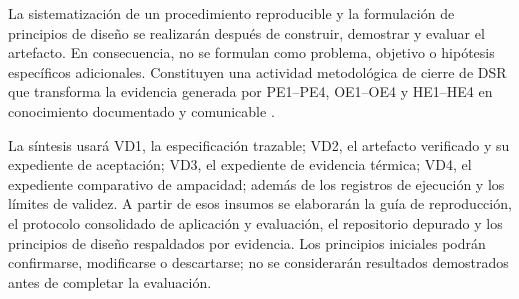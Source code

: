 La sistematización de un procedimiento reproducible y la formulación de principios de diseño se realizarán después de construir, demostrar y evaluar el artefacto. En consecuencia, no se formulan como problema, objetivo o hipótesis específicos adicionales. Constituyen una actividad metodológica de cierre de DSR que transforma la evidencia generada por PE1--PE4, OE1--OE4 y HE1--HE4 en conocimiento documentado y comunicable \parencites[55--56]{peffers2007}[342--350]{gregor2013}.

La síntesis usará VD1, la especificación trazable; VD2, el artefacto verificado y su expediente de aceptación; VD3, el expediente de evidencia térmica; VD4, el expediente comparativo de ampacidad; además de los registros de ejecución y los límites de validez. A partir de esos insumos se elaborarán la guía de reproducción, el protocolo consolidado de aplicación y evaluación, el repositorio depurado y los principios de diseño respaldados por evidencia. Los principios iniciales podrán confirmarse, modificarse o descartarse; no se considerarán resultados demostrados antes de completar la evaluación.


